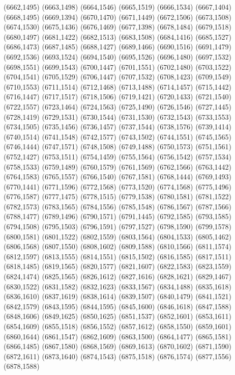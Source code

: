 (6662,1495)
(6663,1498)
(6664,1546)
(6665,1519)
(6666,1534)
(6667,1404)
(6668,1495)
(6669,1394)
(6670,1470)
(6671,1449)
(6672,1506)
(6673,1508)
(6674,1530)
(6675,1436)
(6676,1469)
(6677,1398)
(6678,1484)
(6679,1518)
(6680,1497)
(6681,1422)
(6682,1513)
(6683,1508)
(6684,1416)
(6685,1527)
(6686,1473)
(6687,1485)
(6688,1427)
(6689,1466)
(6690,1516)
(6691,1479)
(6692,1536)
(6693,1524)
(6694,1540)
(6695,1526)
(6696,1480)
(6697,1532)
(6698,1551)
(6699,1543)
(6700,1447)
(6701,1551)
(6702,1480)
(6703,1522)
(6704,1541)
(6705,1529)
(6706,1447)
(6707,1532)
(6708,1423)
(6709,1549)
(6710,1553)
(6711,1514)
(6712,1468)
(6713,1488)
(6714,1457)
(6715,1442)
(6716,1447)
(6717,1517)
(6718,1506)
(6719,1421)
(6720,1433)
(6721,1540)
(6722,1557)
(6723,1464)
(6724,1563)
(6725,1490)
(6726,1546)
(6727,1445)
(6728,1419)
(6729,1531)
(6730,1544)
(6731,1530)
(6732,1543)
(6733,1553)
(6734,1505)
(6735,1456)
(6736,1457)
(6737,1544)
(6738,1576)
(6739,1414)
(6740,1514)
(6741,1548)
(6742,1577)
(6743,1502)
(6744,1551)
(6745,1565)
(6746,1444)
(6747,1571)
(6748,1508)
(6749,1488)
(6750,1573)
(6751,1561)
(6752,1427)
(6753,1511)
(6754,1459)
(6755,1564)
(6756,1542)
(6757,1534)
(6758,1533)
(6759,1489)
(6760,1579)
(6761,1569)
(6762,1566)
(6763,1442)
(6764,1583)
(6765,1557)
(6766,1540)
(6767,1581)
(6768,1444)
(6769,1493)
(6770,1441)
(6771,1596)
(6772,1568)
(6773,1520)
(6774,1568)
(6775,1496)
(6776,1587)
(6777,1475)
(6778,1515)
(6779,1538)
(6780,1581)
(6781,1522)
(6782,1573)
(6783,1565)
(6784,1556)
(6785,1548)
(6786,1567)
(6787,1566)
(6788,1477)
(6789,1496)
(6790,1571)
(6791,1445)
(6792,1585)
(6793,1585)
(6794,1508)
(6795,1503)
(6796,1591)
(6797,1527)
(6798,1590)
(6799,1578)
(6800,1581)
(6801,1522)
(6802,1559)
(6803,1564)
(6804,1533)
(6805,1462)
(6806,1568)
(6807,1550)
(6808,1602)
(6809,1588)
(6810,1566)
(6811,1574)
(6812,1597)
(6813,1555)
(6814,1551)
(6815,1502)
(6816,1585)
(6817,1511)
(6818,1485)
(6819,1565)
(6820,1577)
(6821,1607)
(6822,1583)
(6823,1559)
(6824,1474)
(6825,1565)
(6826,1612)
(6827,1616)
(6828,1621)
(6829,1467)
(6830,1522)
(6831,1582)
(6832,1623)
(6833,1567)
(6834,1488)
(6835,1618)
(6836,1610)
(6837,1619)
(6838,1614)
(6839,1507)
(6840,1479)
(6841,1521)
(6842,1579)
(6843,1595)
(6844,1595)
(6845,1600)
(6846,1618)
(6847,1588)
(6848,1606)
(6849,1625)
(6850,1625)
(6851,1537)
(6852,1601)
(6853,1611)
(6854,1609)
(6855,1518)
(6856,1552)
(6857,1612)
(6858,1550)
(6859,1601)
(6860,1644)
(6861,1547)
(6862,1609)
(6863,1500)
(6864,1477)
(6865,1581)
(6866,1485)
(6867,1580)
(6868,1569)
(6869,1613)
(6870,1602)
(6871,1590)
(6872,1611)
(6873,1640)
(6874,1543)
(6875,1518)
(6876,1574)
(6877,1556)
(6878,1588)
